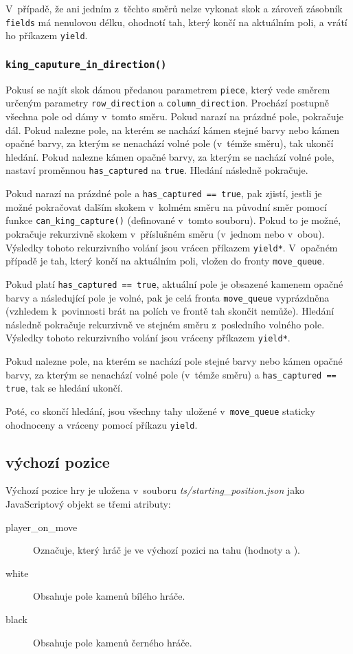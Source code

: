 \documentclass[a4paper,12pt]{article}
\begin{document}
	V~případě, že ani jedním z~těchto směrů nelze vykonat skok a zároveň zásobník
	\texttt{fields} má nenulovou délku, ohodnotí tah, který končí na aktuálním poli,
	a vrátí ho příkazem \texttt{yield}.
	
	\subsubsection*{\texttt{king\_caputure\_in\_direction()}}
	Pokusí se najít skok dámou předanou parametrem \texttt{piece}, který vede směrem určeným
	parametry \texttt{row\_direction} a \texttt{column\_direction}. Prochází postupně všechna
	pole od dámy v~tomto směru. Pokud narazí na prázdné pole, pokračuje dál. Pokud nalezne pole,
	na kterém se nachází kámen stejné barvy nebo kámen opačné barvy, za kterým se nenachází volné
	pole (v~témže směru), tak ukončí hledání. Pokud nalezne kámen opačné barvy, za kterým se
	nachází volné pole, nastaví proměnnou \texttt{has\_captured} na \texttt{true}.
	Hledání následně pokračuje.
	
	Pokud narazí na prázdné pole a \texttt{has\_captured == true},
	pak zjistí, jestli je možné pokračovat dalším skokem v~kolmém směru na původní směr pomocí funkce
	\verb|can_king_capture()| (definované v~tomto souboru). Pokud to je možné, pokračuje rekurzivně
	skokem v~příslušném směru (v~jednom nebo v~obou). Výsledky tohoto rekurzivního volání jsou vrácen
	příkazem \texttt{yield*}. V~opačném případě je tah, který končí na aktuálním poli, vložen do
	fronty \texttt{move\_queue}.
	
	Pokud platí \texttt{has\_captured == true}, aktuální pole je obsazené kamenem opačné barvy
	a následující pole je volné, pak je celá fronta \texttt{move\_queue} vyprázdněna (vzhledem k~povinnosti
	brát na polích ve frontě tah skončit nemůže). Hledání následně pokračuje rekurzivně ve stejném směru
	z~posledního volného pole. Výsledky tohoto rekurzivního volání jsou vráceny příkazem \texttt{yield*}.
	
	Pokud nalezne pole, na kterém se nachází pole stejné barvy nebo kámen opačné barvy, za kterým se nenachází 
	volné pole (v~témže směru) a \texttt{has\_captured == true}, tak se hledání ukončí.
	
	Poté, co skončí hledání, jsou všechny tahy uložené v~\texttt{move\_queue} staticky ohodnoceny
	a vráceny pomocí příkazu \texttt{yield}.
	
	\subsection{výchozí pozice}
	Výchozí pozice hry je uložena v~souboru \textit{ts/starting\_position.json} jako JavaScriptový objekt se třemi atributy:
	\begin{description}
		\item[player\_on\_move] Označuje, který hráč je ve výchozí pozici na tahu (hodnoty  a ).
		\item[white] Obsahuje pole kamenů bílého hráče.
		\item[black] Obsahuje pole kamenů černého hráče.
	\end{description}
	
\end{document}

